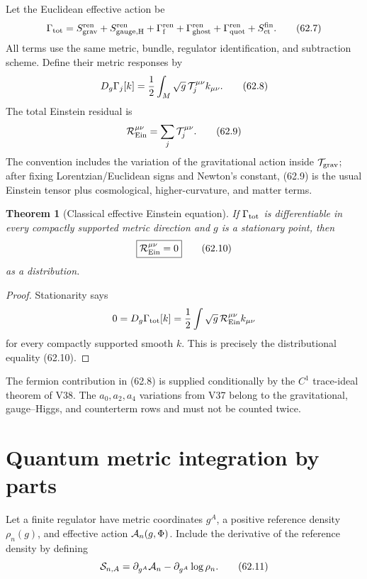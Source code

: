 \documentclass[11pt]{article}
\newtheorem{theorem}{Theorem}[section]
\theoremstyle{remark}
\begin{document}
Let the Euclidean effective action be
\[
 \Gamma_{\rm tot}
 =S_{\rm grav}^{\rm ren}
 +S_{\rm gauge,H}^{\rm ren}
 +\Gamma_{\rm f}^{\rm ren}
 +\Gamma_{\rm ghost}^{\rm ren}
 +\Gamma_{\rm quot}^{\rm ren}
 +S_{\rm ct}^{\rm fin}.                                 \tag{62.7}
\]
All terms use the same metric, bundle, regulator identification,
and subtraction scheme.  Define their metric responses by
\[
 D_g\Gamma_j[k]
 =\frac12\int_M\sqrt g\,
 {\cal T}_j^{\mu\nu}k_{\mu\nu}.                         \tag{62.8}
\]
The total Einstein residual is
\[
 {\cal R}_{\rm Ein}^{\mu\nu}
 =\sum_j{\cal T}_j^{\mu\nu}.                            \tag{62.9}
\]
The convention includes the variation of the gravitational action
inside \({\cal T}_{\rm grav}\); after fixing Lorentzian/Euclidean
signs and Newton's constant, (62.9) is the usual Einstein tensor
plus cosmological, higher-curvature, and matter terms.

\begin{theorem}[Classical effective Einstein equation]
\label{thm:v15v62-classical-einstein}
If \(\Gamma_{\rm tot}\) is differentiable in every compactly
supported metric direction and \(g\) is a stationary point, then
\[
 \boxed{{\cal R}_{\rm Ein}^{\mu\nu}=0}                  \tag{62.10}
\]
as a distribution.
\end{theorem}

\begin{proof}
Stationarity says
\[
 0=D_g\Gamma_{\rm tot}[k]
 =\frac12\int\sqrt g\,{\cal R}_{\rm Ein}^{\mu\nu}
 k_{\mu\nu}
\]
for every compactly supported smooth \(k\).  This is precisely the
distributional equality (62.10).
\end{proof}

The fermion contribution in (62.8) is supplied conditionally by
the \(C^1\) trace-ideal theorem of V38.  The \(a_0,a_2,a_4\)
variations from V37 belong to the gravitational, gauge--Higgs, and
counterterm rows and must not be counted twice.

\section{Quantum metric integration by parts}

Let a finite regulator have metric coordinates \(g^A\), a positive
reference density \(\rho_n(g)\), and effective action
\({\cal A}_n(g,\Phi)\).  Include the derivative of the reference
density by defining
\[
 {\cal S}_{n,A}
 =\partial_{g^A}{\cal A}_n
 -\partial_{g^A}\log\rho_n.                             \tag{62.11}
\]
\end{document}
